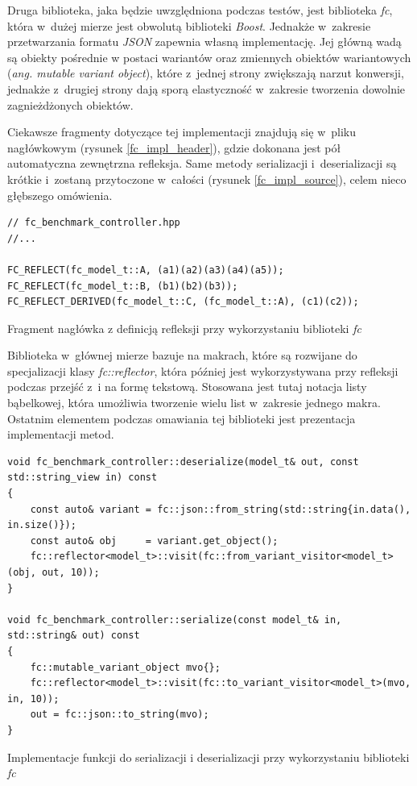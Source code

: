 \documentclass[12pt]{article}
\newcommand{\n}{\newline}
\newcommand{\nonpl}[1]{{\it #1}}
\newcommand{\code}[1]{{\it #1}}
\newcommand{\ang}[1]{\nonpl{ang. #1}}
\newcommand{\JSON}{\nonpl{JSON} }
\begin{document}
{{{				Druga biblioteka, jaka będzie uwzględniona podczas testów, jest biblioteka \nonpl{fc}\cite{fc_repo}, która w~dużej mierze jest obwolutą biblioteki
				\nonpl{Boost}\cite{boost}. Jednakże w~zakresie przetwarzania formatu \JSON zapewnia własną implementację. Jej główną wadą są obiekty pośrednie
				w postaci wariantów oraz zmiennych obiektów wariantowych (\ang{mutable variant object}), które z~jednej strony zwiększają narzut konwersji,
				jednakże z~drugiej strony dają sporą elastyczność w~zakresie tworzenia dowolnie zagnieżdżonych obiektów.\n

				Ciekawsze fragmenty dotyczące tej implementacji znajdują się w~pliku nagłówkowym (rysunek \ref{fc_impl_header}), gdzie dokonana jest
				pół automatyczna zewnętrzna refleksja. Same metody serializacji i~deserializacji są krótkie i~zostaną przytoczone w~całości (rysunek \ref{fc_impl_source}),
				celem nieco głębszego omówienia.\n

				\begin{captioned}[H]
					\begin{lstlisting}[frame=single]
// fc_benchmark_controller.hpp
//...

FC_REFLECT(fc_model_t::A, (a1)(a2)(a3)(a4)(a5));
FC_REFLECT(fc_model_t::B, (b1)(b2)(b3));
FC_REFLECT_DERIVED(fc_model_t::C, (fc_model_t::A), (c1)(c2));
					\end{lstlisting}
					\caption{ Fragment nagłówka z definicją refleksji przy wykorzystaniu biblioteki \nonpl{fc}}
					\label{fc_impl_header}
				\end{captioned}

				Biblioteka w~głównej mierze bazuje na makrach, które są rozwijane do specjalizacji klasy \code{fc::reflector}, która później jest
				wykorzystywana przy refleksji podczas przejść z~i na formę tekstową. Stosowana jest tutaj notacja listy bąbelkowej, która umożliwia
				tworzenie wielu list w~zakresie jednego makra. Ostatnim elementem podczas omawiania tej biblioteki jest prezentacja implementacji metod.\n

				\begin{captioned}[H]
					\begin{lstlisting}[frame=single]
void fc_benchmark_controller::deserialize(model_t& out, const std::string_view in) const
{
	const auto& variant = fc::json::from_string(std::string{in.data(), in.size()});
	const auto& obj	    = variant.get_object();
	fc::reflector<model_t>::visit(fc::from_variant_visitor<model_t>(obj, out, 10));
}

void fc_benchmark_controller::serialize(const model_t& in, std::string& out) const
{
	fc::mutable_variant_object mvo{};
	fc::reflector<model_t>::visit(fc::to_variant_visitor<model_t>(mvo, in, 10));
	out = fc::json::to_string(mvo);
}
					\end{lstlisting}
					\caption{ Implementacje funkcji do serializacji i deserializacji przy wykorzystaniu biblioteki \nonpl{fc}}
					\label{fc_impl_source}
				\end{captioned}

}}}
\end{document}
